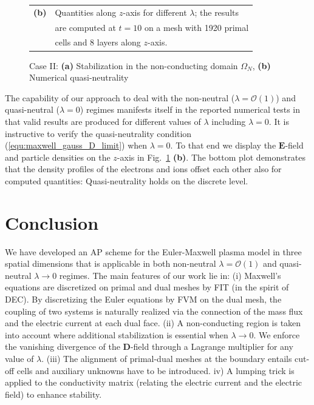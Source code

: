 \documentclass{article}
\begin{document}
\begin{figure}
\begin{minipage}[t]{0.6\textwidth}
   \parbox{0.9\textwidth}{\begin{tabular}[c]{ll}
     \textbf{(b)} & Quantities along $z$-axis for different $\lambda$; the results \\ & 
     are computed at $t = 10$ on a mesh with 1920 primal  \\ &  cells and 8 layers along $z$-axis.
   \end{tabular}}
\end{minipage}%

\caption{Case II: \textbf{(a)} Stabilization in the non-conducting domain $\Omega_N$,
  \textbf{(b)} Numerical quasi-neutrality    }
\label{fig:stabilization_comparison}
\end{figure}

The capability of our approach to deal with the non-neutral ($\lambda = \mathcal{O}(1)$)
and quasi-neutral ($\lambda = 0$) regimes manifests itself in the reported numerical tests
in that valid results are produced for different values of $\lambda$ including
$\lambda=0$. It is instructive to verify the quasi-neutrality condition
(\ref{equ:maxwell_gauss_D_limit}) when $\lambda = 0$. To that end we display the
$\mathbf{E}$-field and particle densities on the $z$-axis in
Fig.~\ref{fig:stabilization_comparison} \textbf{(b)}. The bottom plot demonstrates that
the density profiles of the electrons and ions offset each other also for computed quantities:
Quasi-neutrality holds on the discrete level.

\section{Conclusion}

We have developed an AP scheme for the Euler-Maxwell plasma model in three spatial
dimensions that is applicable in both non-neutral $\lambda = \mathcal{O}(1)$ and
quasi-neutral $\lambda \rightarrow 0$ regimes. The main features of our work lie in: (i)
Maxwell's equations are discretized on primal and dual meshes by FIT (in the spirit of
DEC). By discretizing the Euler equations by FVM on the dual mesh, the coupling of two systems
is naturally realized via the connection of the mass flux and the electric current at each
dual face. (ii) A non-conducting region is taken into account where additional
stabilization is essential when $\lambda \rightarrow 0$. We enforce the vanishing
divergence of the $\mathbf{D}$-field through a Lagrange multiplier for any value of
$\lambda$. (iii) The alignment of primal-dual meshes at the boundary entails cut-off cells
and auxiliary unknowns have to be introduced. iv) A lumping trick is applied to the
conductivity matrix (relating the electric current and the electric field) to enhance
stability.
\end{document}

